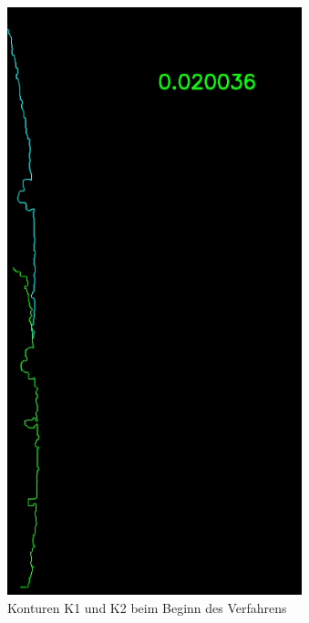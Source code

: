 \begin{figure}[h]
\begin{minipage}{0.24\textwidth}
        \caption{Konturen K1 und K2 beim Beginn des Verfahrens}
        \label{fig:stitching_beginn}
    \end{minipage}
    \begin{minipage}{0.24\textwidth}
        \centering
        \includegraphics[width=\textwidth]{images/stitching_middle.PNG} %

\end{minipage}
\end{figure}
